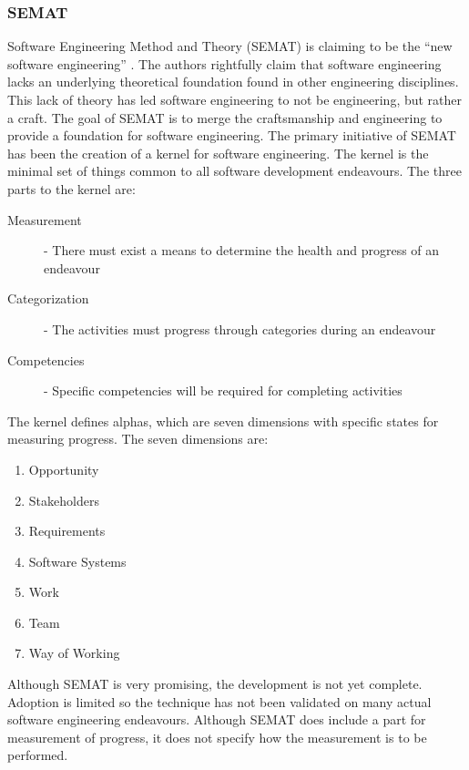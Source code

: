 \documentclass[SDSUThesis.tex]{subfiles}
\begin{document}
\subsubsection{SEMAT}

    Software Engineering Method and Theory (SEMAT) is claiming to be the ``new software engineering'' 
    \cite{Jacobson2014}.  The authors rightfully claim that software engineering lacks
    an underlying theoretical foundation found in other engineering disciplines.  This lack of theory
    has led software engineering to not be engineering, but rather a craft.  The goal of 
    SEMAT is to merge the craftsmanship and engineering to provide a foundation for software
    engineering.  The primary initiative of SEMAT has been the creation of a kernel for 
    software engineering.  The kernel is the minimal set of things common to all software development
    endeavours. The three parts to the kernel are:
    \begin{description}
        \item[Measurement] - There must exist a means to determine the health and progress of an endeavour
        \item[Categorization]-  The activities must progress through categories during an endeavour
        \item[Competencies] - Specific competencies will be required for completing activities
    \end{description}
    The kernel defines alphas, which are seven dimensions with
    specific states for measuring progress. 
    The seven dimensions are: 
    \begin{enumerate}
        \item Opportunity
        \item Stakeholders
        \item Requirements
        \item Software Systems
        \item Work
        \item Team
        \item Way of Working
    \end{enumerate}
    
    Although SEMAT is very promising, the development is not yet complete.  Adoption is
    limited so the technique has not been validated on many
    actual software engineering endeavours.  Although SEMAT does include a part for
    measurement of progress, it does not specify how the measurement is to be 
    performed.
    
\end{document}
